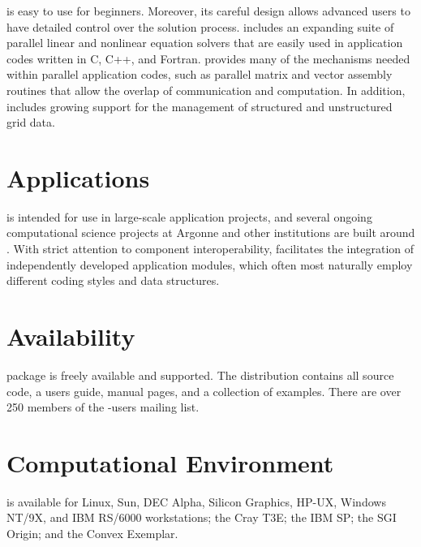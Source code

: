  is easy to use for beginners.  Moreover, its careful
design allows advanced users to have detailed control over the
solution process.  includes an expanding suite of parallel
linear and nonlinear equation solvers that are easily used in
application codes written in C, C++, and Fortran.  
provides many of the mechanisms needed within parallel application
codes, such as parallel matrix and vector assembly routines
that allow the overlap of communication and computation.  In addition,
 includes growing support for the management of structured and
unstructured grid data.
\vsp

\section*{Applications}
 is intended for use in large-scale application projects, and
several ongoing computational science projects at Argonne
and other institutions are built around .
With strict attention to component interoperability, 
facilitates the integration of independently developed application
modules, which often most naturally employ different coding styles and
data structures. 

\section*{Availability}

 package is freely available and supported.
The  distribution contains all source code, 
a users guide, manual pages, and a
collection of examples. There are over 250 members of the -users mailing list.

\section*{Computational Environment}
 is available for Linux, Sun, DEC Alpha, Silicon Graphics, HP-UX, Windows NT/9X, 
and IBM RS/6000 workstations; the Cray T3E; the IBM SP; the SGI Origin; and the Convex Exemplar.

\vspace{-.1cm}
\makeinfo

